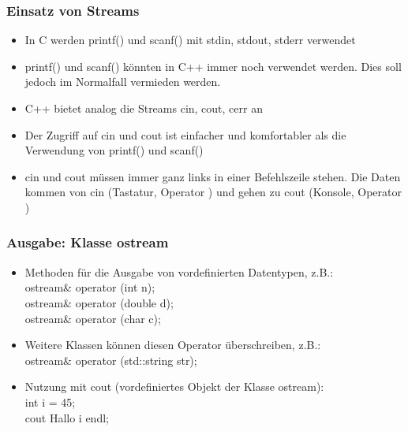 \subsubsection{Einsatz von Streams\hfill}
\label{sec:Einsatz von Streams}
\begin{itemize}
	\item In C werden printf() und scanf() mit stdin, stdout, stderr verwendet
	\item printf() und scanf() könnten in C++ immer noch verwendet werden. Dies soll jedoch im Normalfall vermieden werden.
	\item C++ bietet analog die Streams cin, cout, cerr an
	\item Der Zugriff auf cin und cout ist einfacher und komfortabler als die Verwendung von printf() und scanf()
	\item cin und cout müssen immer ganz links in einer Befehlszeile stehen. Die Daten kommen von cin (Tastatur, Operator \frq\frq) und gehen zu cout (Konsole, Operator \flq\flq)
\end{itemize}

\subsubsection{Ausgabe: Klasse ostream\hfill}
\label{sec:Ausgabe: Klasse ostream}
\begin{itemize}
	\item Methoden für die Ausgabe von vordefinierten Datentypen, z.B.:
		\\ ostream\& operator \flq\flq(int n);
		\\ ostream\& operator \flq\flq(double d);
		\\ ostream\& operator \flq\flq(char c);
	\item Weitere Klassen können diesen Operator überschreiben, z.B.:
		\\ ostream\& operator \flq\flq(std::string str);
	\item Nutzung mit cout (vordefiniertes Objekt der Klasse ostream):
		\\ int i = 45;
		\\cout \flq\flq \grqq Hallo  \grqq \flq\flq i \flq\flq endl;
\end{itemize}

